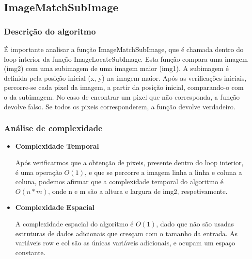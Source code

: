 \label{sec:imagematchsubimage/formal}

\subsection{ImageMatchSubImage}

\subsubsection{Descrição do algoritmo}

É importante analisar a função ImageMatchSubImage, que é chamada dentro do loop interior da função ImageLocateSubImage. Esta função compara uma imagem (img2) com uma subimagem de uma imagem maior (img1). A subimagem é definida pela posição inicial (x, y) na imagem maior. Após as verificações iniciais, percorre-se cada pixel da imagem, a partir da posição inicial, comparando-o com o da subimagem. No caso de encontrar um pixel que não corresponda, a função devolve falso. Se todos os pixeis corresponderem, a função devolve verdadeiro.

\subsubsection{Análise de complexidade}

\begin{itemize}
    
\item
\textbf{Complexidade Temporal}

Após verificarmos que a obtenção de pixeis, presente dentro do loop interior, é uma operação $O(1)$, e que se percorre a imagem linha a linha e coluna a coluna, podemos afirmar que a complexidade temporal do algoritmo é $O(n*m)$, onde n e m são a altura e largura de img2, respetivamente.

\item
\textbf{Complexidade Espacial}

A complexidade espacial do algoritmo é $O(1)$, dado que não são usadas estruturas de dados adicionais que cresçam com o tamanho da entrada. As variáveis row e col são as únicas variáveis adicionais, e ocupam um espaço constante.

\end{itemize}
